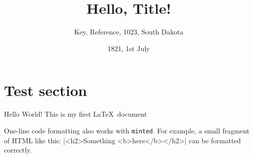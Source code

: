 \title{Hello, Title!}
\author{Key, Reference, 1023, South Dakota}
\date{1821, 1st July}


\setcounter{tocdepth}{0}


\maketitle

\pagebreak

\tableofcontents

\pagebreak



\section*{Test section}

Hello World! This is my first \LaTeX\ document

One-line code formatting also works with \texttt{minted}. For example, a small fragment of HTML like this:
|<h2>Something <b>here</b></h2>|
\noindent can be formatted correctly.


